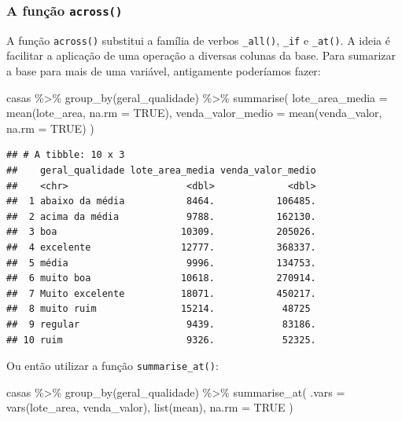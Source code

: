 \documentclass[
]{book}
\newenvironment{Shaded}{\begin{snugshade}}{\end{snugshade}}
\newcommand{\AttributeTok}[1]{\textcolor[rgb]{0.77,0.63,0.00}{#1}}
\newcommand{\ConstantTok}[1]{\textcolor[rgb]{0.00,0.00,0.00}{#1}}
\newcommand{\FunctionTok}[1]{\textcolor[rgb]{0.00,0.00,0.00}{#1}}
\newcommand{\NormalTok}[1]{#1}
\newcommand{\SpecialCharTok}[1]{\textcolor[rgb]{0.00,0.00,0.00}{#1}}
\begin{document}
\hypertarget{a-funuxe7uxe3o-across}{%
\subsubsection*{\texorpdfstring{A função \texttt{across()}}{A função across()}}\label{a-funuxe7uxe3o-across}}

A função \texttt{across()} substitui a família de verbos \texttt{\_all()}, \texttt{\_if} e \texttt{\_at()}. A ideia é facilitar a aplicação de uma operação a diversas colunas da base. Para sumarizar a base para mais de uma variável, antigamente poderíamos fazer:

\begin{Shaded}
\begin{Highlighting}[]
\NormalTok{casas }\SpecialCharTok{\%\textgreater{}\%}
  \FunctionTok{group\_by}\NormalTok{(geral\_qualidade) }\SpecialCharTok{\%\textgreater{}\%}
  \FunctionTok{summarise}\NormalTok{(}
    \AttributeTok{lote\_area\_media =} \FunctionTok{mean}\NormalTok{(lote\_area, }\AttributeTok{na.rm =} \ConstantTok{TRUE}\NormalTok{),}
    \AttributeTok{venda\_valor\_medio =} \FunctionTok{mean}\NormalTok{(venda\_valor, }\AttributeTok{na.rm =} \ConstantTok{TRUE}\NormalTok{)}
\NormalTok{  )}
\end{Highlighting}
\end{Shaded}

\begin{verbatim}
## # A tibble: 10 x 3
##    geral_qualidade lote_area_media venda_valor_medio
##    <chr>                     <dbl>             <dbl>
##  1 abaixo da média           8464.           106485.
##  2 acima da média            9788.           162130.
##  3 boa                      10309.           205026.
##  4 excelente                12777.           368337.
##  5 média                     9996.           134753.
##  6 muito boa                10618.           270914.
##  7 Muito excelente          18071.           450217.
##  8 muito ruim               15214.            48725 
##  9 regular                   9439.            83186.
## 10 ruim                      9326.            52325.
\end{verbatim}

Ou então utilizar a função \texttt{summarise\_at()}:

\begin{Shaded}
\begin{Highlighting}[]
\NormalTok{casas }\SpecialCharTok{\%\textgreater{}\%}
  \FunctionTok{group\_by}\NormalTok{(geral\_qualidade) }\SpecialCharTok{\%\textgreater{}\%}
  \FunctionTok{summarise\_at}\NormalTok{(}
    \AttributeTok{.vars =} \FunctionTok{vars}\NormalTok{(lote\_area, venda\_valor),}
    \FunctionTok{list}\NormalTok{(mean),}
    \AttributeTok{na.rm =} \ConstantTok{TRUE}
\NormalTok{  )}
\end{Highlighting}
\end{Shaded}
\end{document}
